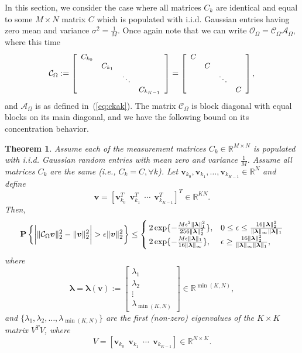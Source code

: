 \documentclass[11pt,draftcls,onecolumn]{IEEEtran}
\def\real    { \mathbb{R} }
\newtheorem{theorem}{Theorem}
\newcommand{\Prob}[1]{{\bf P}\left\{#1\right\}}
\def \ok {{\mathcal{O}_{\Omega}}}
\def \ck {{\mathcal{C}_{\Omega}}}
\def \ak {{\mathcal{A}_{\Omega}}}
\newcommand{\vc}[1]{\boldsymbol{#1}}
\def\real    { \mathbb{R} }
\begin{document}
In this section, we consider the case where all matrices $C_k$ are identical and equal to some $M \times N$ matrix $C$ which is populated with \ac{i.i.d.} Gaussian entries having zero mean and variance $\sigma^2 = \frac{1}{M}$. Once again note that we can write
$
\ok = \ck\ak,
$
where this time
\begin{equation} \small
\ck:=  \left[ \begin{array}{cccc} C_{k_0} &&&\\& C_{k_1} && \\ && \ddots & \\&&& C_{k_{K-1}} \end{array} \right] = \left[ \begin{array}{cccc} C &&&\\& C && \\ && \ddots & \\&&& C \end{array} \right],
\label{eq:ck2}
\end{equation}
and $\ak$ is as defined in~(\ref{eq:ckak}). The matrix $\ck$ is block diagonal with equal blocks on its main diagonal, and we have the following bound on its concentration behavior.

\begin{theorem} {\em \cite{park2011block}} Assume each of the measurement matrices $C_k \in \real^{M \times N}$ is populated with \ac{i.i.d.} Gaussian random entries with mean zero and variance $\frac{1}{M}$. Assume all matrices $C_k$ are the same (i.e., $C_k = C, \forall k$). Let $\vc{v}_{k_0}, \vc{v}_{k_1}, \dots, \vc{v}_{k_{K-1}} \in \real^N$ and define
$$
\vc{v} = \left[\vc{v}^T_{k_0} ~~ \vc{v}^T_{k_1} ~~ \cdots ~~ \vc{v}^T_{k_{K-1}} \right]^T \in \real^{KN}.
$$
Then,
\begin{equation}
\Prob{\bigg{|}\|\ck \vc{v}\|_{2}^{2}-\|\vc{v}\|_2^2\bigg{|} > \epsilon\|\vc{v}\|_{2}^{2}}
\leq
\begin{cases}
2\exp\{-\frac{M\epsilon^{2}\|\vc{\lambda}\|_{1}^{2}}{256\|\vc{\lambda}\|_{2}^{2}}\},& 0\leq\epsilon\leq\frac{16\|\vc{\lambda}\|_{2}^{2}}{\|\vc{\lambda}\|_{\infty}\|\vc{\lambda}\|_{1}} \\
2\exp\{-\frac{M\epsilon\|\vc{\lambda}\|_{1}}{16\|\vc{\lambda}\|_{\infty}}\},&
\epsilon\geq\frac{16\|\vc{\lambda}\|_{2}^{2}}{\|\vc{\lambda}\|_{\infty}\|\vc{\lambda}\|_{1}},
\end{cases}
\end{equation}
where
$$
\vc{\lambda} = \vc{\lambda}\left(\vc{v}\right) := \left[\begin{array}{c} \lambda_1 \\ \lambda_2 \\ \vdots \\ \lambda_{\min(K,N)}
\end{array} \right] \in \real^{{\min(K,N)}},
$$
and $\{\lambda_1, \lambda_2, \dots, \lambda_{\min(K,N)}\}$ are the first (non-zero) eigenvalues of the $K \times K$ matrix $V^T V$, where
\[
V = \left[\vc{v}_{k_0} ~~ \vc{v}_{k_1} ~~ \cdots ~~ \vc{v}_{k_{K-1}} \right]\in \real^{N \times K}.
\]
\label{thm:block2}
\end{theorem}
\end{document}
